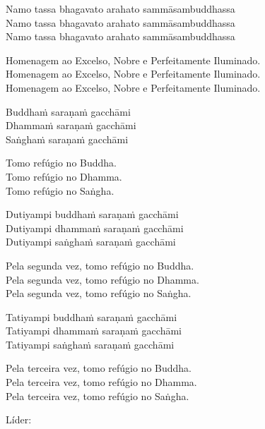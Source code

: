 Namo tassa bhagavato arahato sammāsambuddhassa\\
Namo tassa bhagavato arahato sammāsambuddhassa\\
Namo tassa bhagavato arahato sammāsambuddhassa

\begin{english}
  Homenagem ao Excelso, Nobre e Perfeitamente Iluminado.\\
  Homenagem ao Excelso, Nobre e Perfeitamente Iluminado.\\
  Homenagem ao Excelso, Nobre e Perfeitamente Iluminado.
\end{english}

Buddhaṁ saraṇaṁ gacchāmi\\
Dhammaṁ saraṇaṁ gacchāmi\\
Saṅghaṁ saraṇaṁ gacchāmi

\begin{english}
  Tomo refúgio no Buddha.\\
  Tomo refúgio no Dhamma.\\
  Tomo refúgio no Saṅgha.
\end{english}

Dutiyampi buddhaṁ saraṇaṁ gacchāmi\\
Dutiyampi dhammaṁ saraṇaṁ gacchāmi\\
Dutiyampi saṅghaṁ saraṇaṁ gacchāmi

\begin{english}
  Pela segunda vez, tomo refúgio no Buddha.\\
  Pela segunda vez, tomo refúgio no Dhamma.\\
  Pela segunda vez, tomo refúgio no Saṅgha.
\end{english}

Tatiyampi buddhaṁ saraṇaṁ gacchāmi\\
Tatiyampi dhammaṁ saraṇaṁ gacchāmi\\
Tatiyampi saṅghaṁ saraṇaṁ gacchāmi

\clearpage

\begin{english}
  Pela terceira vez, tomo refúgio no Buddha.\\
  Pela terceira vez, tomo refúgio no Dhamma.\\
  Pela terceira vez, tomo refúgio no Saṅgha.
\end{english}

\begin{instruction}
  Líder:
\end{instruction}

